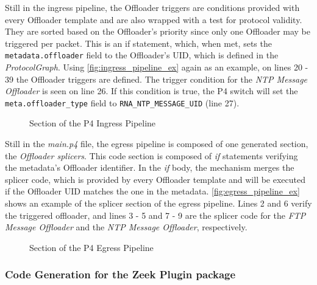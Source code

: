 Still in the ingress pipeline, the Offloader triggers are conditions provided with every Offloader template and are also wrapped with a test for protocol validity. They are sorted based on the Offloader's priority since only one Offloader may be triggered per packet. This is an if statement, which, when met, sets the \texttt{metadata.offloader} field to the Offloader's UID, which is defined in the \textit{ProtocolGraph}. Using \autoref{fig:ingress_pipeline_ex} again as an example, on lines 20 - 39 the Offloader triggers are defined. The trigger condition for the \textit{NTP Message Offloader} is seen on line 26. If this condition is true, the P4 switch will set the \texttt{meta.offloader\_type} field to \texttt{RNA\_NTP\_MESSAGE\_UID} (line 27).


\begin{figure}[htb]
    \caption{Section of the P4 Ingress Pipeline}
    \begin{center}
        
    \end{center}
    \label{fig:ingress_pipeline_ex}
\end{figure}

Still in the \textit{main.p4} file, the egress pipeline is composed of one generated section, the \textit{Offloader splicers}. This code section is composed of \textit{if} statements verifying the metadata's Offloader identifier. In the \textit{if} body, the mechanism merges the splicer code, which is provided by every Offloader template and will be executed if the Offloader UID matches the one in the metadata. \autoref{fig:egress_pipeline_ex} shows an example of the splicer section of the egress pipeline. Lines 2 and 6 verify the triggered offloader, and lines 3 - 5 and 7 - 9 are the splicer code for the \textit{FTP Message Offloader} and the \textit{NTP Message Offloader}, respectively.

\begin{figure}[htb]
    \caption{Section of the P4 Egress Pipeline}
    \begin{center}
        
    \end{center}
    \label{fig:egress_pipeline_ex}
\end{figure}

\subsubsection*{Code Generation for the Zeek Plugin package}

